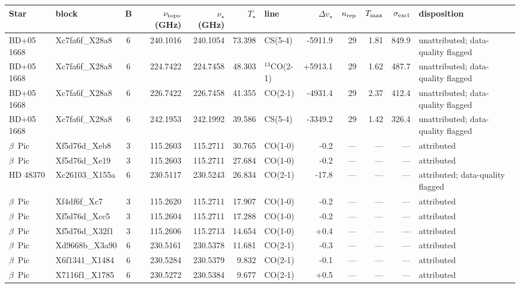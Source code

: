 \begin{tabular}{@{}l@{~}l@{~}c@{~}r@{~}r@{~}r@{~}l@{~}r@{~~}r@{~}r@{~}r@{~}l@{}}
\hline
Star & block & B & $\nu_{\rm topo}$ (GHz) & $\nu_{\star}$ (GHz) & $T_\star$ & line & $\Delta v_{\star}$ & $n_{\rm rep}$ & $T_{\rm max}$ & $\sigma_{\rm excl}$ & disposition \\
\hline
BD+05 1668 & Xc7fa6f\_X28a8 & 6 & 240.1016 & 240.1054 & 73.398 & CS(5-4) & -5911.9 & 29 & 1.81 & 849.9 & unattributed; data-quality flagged \\
BD+05 1668 & Xc7fa6f\_X28a8 & 6 & 224.7422 & 224.7458 & 48.303 & $^{13}$CO(2-1) & +5913.1 & 29 & 1.62 & 487.7 & unattributed; data-quality flagged \\
BD+05 1668 & Xc7fa6f\_X28a8 & 6 & 226.7422 & 226.7458 & 41.355 & CO(2-1) & -4931.4 & 29 & 2.37 & 412.4 & unattributed; data-quality flagged \\
BD+05 1668 & Xc7fa6f\_X28a8 & 6 & 242.1953 & 242.1992 & 39.586 & CS(5-4) & -3349.2 & 29 & 1.42 & 326.4 & unattributed; data-quality flagged \\
$\beta$~Pic & Xf5d76d\_Xeb8 & 3 & 115.2603 & 115.2711 & 30.765 & CO(1-0) & -0.2 & --- & --- & --- & attributed \\
$\beta$~Pic & Xf5d76d\_Xe19 & 3 & 115.2603 & 115.2711 & 27.684 & CO(1-0) & -0.2 & --- & --- & --- & attributed \\
HD 48370 & Xc26103\_X155a & 6 & 230.5117 & 230.5243 & 26.834 & CO(2-1) & -17.8 & --- & --- & --- & attributed; data-quality flagged \\
$\beta$~Pic & Xf4df6f\_Xc7 & 3 & 115.2620 & 115.2711 & 17.907 & CO(1-0) & -0.2 & --- & --- & --- & attributed \\
$\beta$~Pic & Xf5d76d\_Xcc5 & 3 & 115.2604 & 115.2711 & 17.288 & CO(1-0) & -0.2 & --- & --- & --- & attributed \\
$\beta$~Pic & Xf5d76d\_X32f1 & 3 & 115.2606 & 115.2713 & 14.654 & CO(1-0) & +0.4 & --- & --- & --- & attributed \\
$\beta$~Pic & Xd9668b\_X3a90 & 6 & 230.5161 & 230.5378 & 11.681 & CO(2-1) & -0.3 & --- & --- & --- & attributed \\
$\beta$~Pic & X6f1341\_X1484 & 6 & 230.5284 & 230.5379 & 9.832 & CO(2-1) & -0.1 & --- & --- & --- & attributed \\
$\beta$~Pic & X7116f1\_X1785 & 6 & 230.5272 & 230.5384 & 9.677 & CO(2-1) & +0.5 & --- & --- & --- & attributed \\

\end{tabular}
